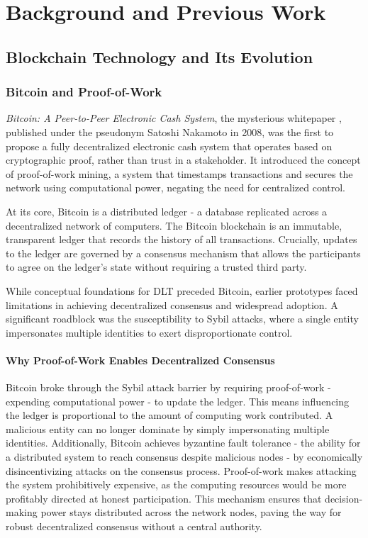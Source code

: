 \documentclass[11pt]{report}
\begin{document}
\chapter{Background and Previous Work} \label{ch:previous_work}


\section{Blockchain Technology and Its Evolution}
\subsection{Bitcoin and Proof-of-Work}
\textit{Bitcoin: A Peer-to-Peer Electronic Cash System}, the mysterious whitepaper \cite{nakamotoBitcoinPeertopeerElectronic2008}, published under the pseudonym Satoshi Nakamoto in 2008, was the first to propose a fully decentralized electronic cash system that operates based on cryptographic proof, rather than trust in a stakeholder. It introduced the concept of proof-of-work mining, a system that timestamps transactions and secures the network using computational power, negating the need for centralized control.

At its core, Bitcoin is a distributed ledger - a database replicated across a decentralized network of computers. The Bitcoin blockchain is an immutable, transparent ledger that records the history of all transactions. Crucially, updates to the ledger are governed by a consensus mechanism that allows the participants to agree on the ledger's state without requiring a trusted third party.

While conceptual foundations for \ac{DLT} preceded Bitcoin, earlier prototypes faced limitations in achieving decentralized consensus and widespread adoption. A significant roadblock was the susceptibility to Sybil attacks, where a single entity impersonates multiple identities to exert disproportionate control.

\subsubsection{Why Proof-of-Work Enables Decentralized Consensus}

Bitcoin broke through the Sybil attack barrier by requiring proof-of-work - expending computational power - to update the ledger. This means influencing the ledger is proportional to the amount of computing work contributed. A malicious entity can no longer dominate by simply impersonating multiple identities. Additionally, Bitcoin achieves byzantine fault tolerance - the ability for a distributed system to reach consensus despite malicious nodes - by economically disincentivizing attacks on the consensus process. Proof-of-work makes attacking the system prohibitively expensive, as the computing resources would be more profitably directed at honest participation. This mechanism ensures that decision-making power stays distributed across the network nodes, paving the way for robust decentralized consensus without a central authority.
\end{document}
